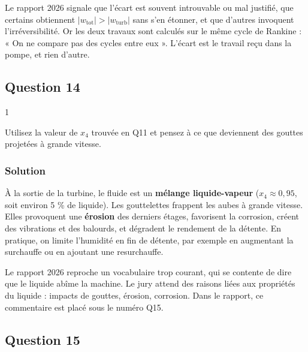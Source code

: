 \documentclass[11pt,a4paper]{article}
\begin{document}
\begin{piege}

Le rapport 2026 signale que l'écart est souvent introuvable ou mal justifié, que certains obtiennent \(|w_{\text{tot}}|>|w_{\text{turb}}|\) sans s'en étonner, et que d'autres invoquent l'irréversibilité. Or les deux travaux sont calculés sur le même cycle de Rankine : « On ne compare pas des cycles entre eux ». L'écart est le travail reçu dans la pompe, et rien d'autre.

\end{piege}

\hypertarget{question-14}{%
\subsection{Question 14}\label{question-14}}

\begin{indication}{1}

Utilisez la valeur de \(x_4\) trouvée en Q11 et pensez à ce que deviennent des gouttes projetées à grande vitesse.

\end{indication}

\hypertarget{solution-13}{%
\subsubsection{Solution}\label{solution-13}}

À la sortie de la turbine, le fluide est un \textbf{mélange liquide-vapeur} (\(x_4\approx0{,}95\), soit environ 5 \% de liquide). Les gouttelettes frappent les aubes à grande vitesse. Elles provoquent une \textbf{érosion} des derniers étages, favorisent la corrosion, créent des vibrations et des balourds, et dégradent le rendement de la détente. En pratique, on limite l'humidité en fin de détente, par exemple en augmentant la surchauffe ou en ajoutant une resurchauffe.

\begin{jury}

Le rapport 2026 reproche un vocabulaire trop courant, qui se contente de dire que le liquide abîme la machine. Le jury attend des raisons liées aux propriétés du liquide : impacts de gouttes, érosion, corrosion. Dans le rapport, ce commentaire est placé sous le numéro Q15.

\end{jury}

\hypertarget{question-15}{%
\subsection{Question 15}\label{question-15}}
\end{document}
